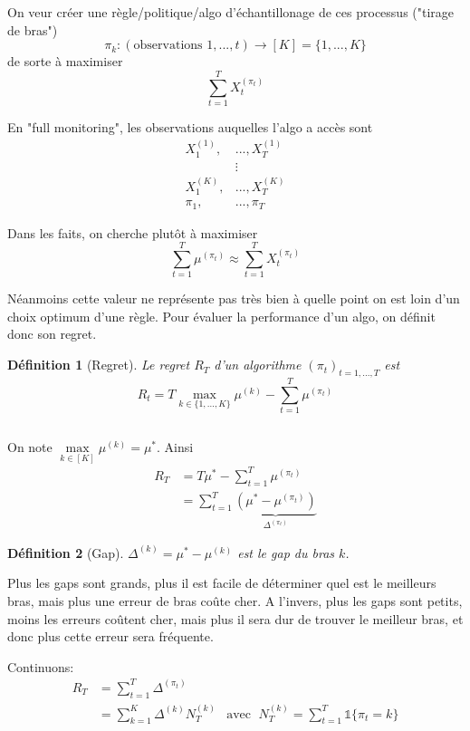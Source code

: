 \documentclass{article}
\newtheorem{definition}{Définition}[section]
\theoremstyle{remark}
\theoremstyle{remark}
\begin{document}
On veur créer une règle/politique/algo d'échantillonage de ces processus ("tirage de bras")
$$\pi_k : (\text{observations $1,...,t$}) \to [K] = \{1, ..., K\}$$
de sorte à maximiser
$$\sum_{t=1}^T X^{(\pi_t)}_t$$

En "full monitoring", les observations auquelles l'algo a accès sont
\begin{align*}
  X^{(1)}_1, &..., X^{(1)}_T \\
  & \vdots \\
  X^{(K)}_1, &..., X^{(K)}_T \\
  \pi_1, &..., \pi_T
\end{align*}

Dans les faits, on cherche plutôt à maximiser
$$\sum_{t=1}^T \mu^{(\pi_t)} \approx \sum_{t=1}^T X^{(\pi_t)}_t$$

Néanmoins cette valeur ne représente pas très bien à quelle point on est loin d'un choix optimum d'une règle.
Pour évaluer la performance d'un algo, on définit donc son regret.

\begin{definition}[Regret]
  Le regret $R_T$ d'un algorithme $(\pi_t)_{t=1,...,T}$ est
  $$
  R_t = T \max_{k \in \{1,...,K\}} \mu^{(k)} - \sum_{t=1}^T \mu^{(\pi_t)}
  $$
\end{definition}
$$ $$ %

On note $\max\limits_{k \in [K]} \mu^{(k)} = \mu^*$.
Ainsi
\begin{align*}
  R_T &= T \mu^* - \sum_{t=1}^T \mu^{(\pi_t)}\\
      &= \sum_{t=1}^T \underbrace{(\mu^* - \mu^{(\pi_t)})}_{\Delta^{(\pi_t)}}
\end{align*}

\begin{definition}[Gap]
  $\Delta^{(k)} = \mu^* - \mu^{(k)}$ est le gap du bras $k$.
\end{definition}

Plus les gaps sont grands, plus il est facile de déterminer quel est le meilleurs bras, mais plus une erreur de bras coûte cher. A l'invers, plus les gaps sont petits, moins les erreurs coûtent cher, mais plus il sera dur de trouver le meilleur bras, et donc plus cette erreur sera fréquente.

Continuons:
\begin{align*}
  R_T &= \sum_{t=1}^T \Delta^{(\pi_t)} \\
      &= \sum_{k=1}^K \Delta^{(k)} N^{(k)}_T
      & \text{avec } \; N_T^{(k)} = \sum_{t=1}^T \mathbb{1}\{\pi_t = k\}
\end{align*}
\end{document}
